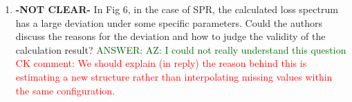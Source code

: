 \documentclass{article}
\begin{document}
\begin{enumerate}
\item \textbf{-NOT CLEAR-} In Fig 6, in the case of SPR, the calculated loss spectrum has a large deviation under some specific parameters. Could the authors discuss the reasons for the deviation and how to judge the validity of the calculation result?
\textcolor{darkgreen}{ANSWER: AZ: I could not really understand this question} \\
\textcolor{red}{CK comment: We should explain (in reply) the reason behind this is estimating a new structure rather than interpolating missing values within the same configuration.}

\end{enumerate}
\end{document}
